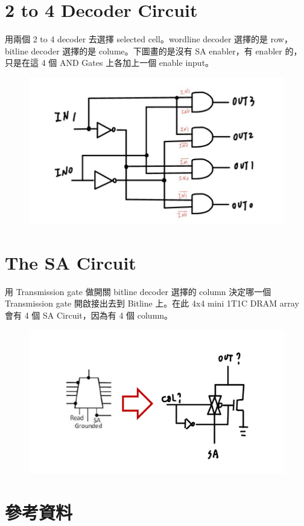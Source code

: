 \documentclass{article}
\begin{document}
\section{2 to 4 Decoder Circuit}

用兩個 2 to 4 decoder 去選擇 selected cell。wordline decoder 選擇的是 row，bitline decoder 選擇的是 colume。下圖畫的是沒有 SA enabler，有 enabler 的，只是在這 4 個 AND Gates 上各加上一個 enable input。

\begin{figure}[H]
  \centering
  \includegraphics[width = 0.5\linewidth]{./img/2023-12-24-16-36-59.png}
  \end{figure}

\section{The SA Circuit}

用 Transmission gate 做開關 bitline decoder 選擇的 column 決定哪一個 Transmission gate 開啟接出去到 Bitline 上。在此 4x4 mini 1T1C DRAM array 會有 4 個 SA Circuit，因為有 4 個 column。

\begin{figure}[H]
  \centering
  \includegraphics[width = 0.6\linewidth]{./img/2023-12-24-16-48-34.png}
  \end{figure}

  \section{參考資料}
\end{document}
